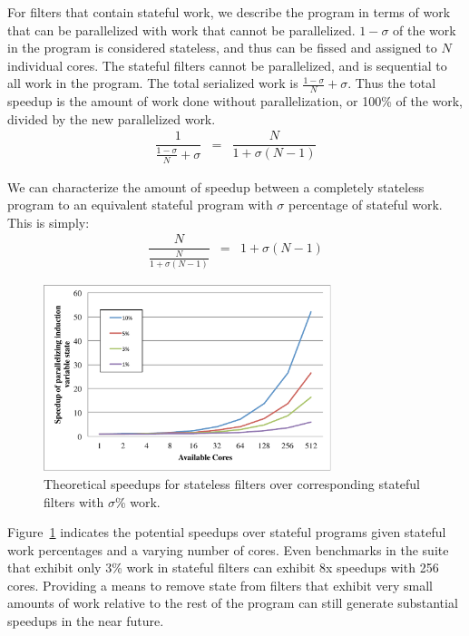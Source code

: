 For filters that contain stateful work, we describe the program in terms of work that can be parallelized with work that cannot be parallelized.  $1-\sigma$ of the work in the program is considered stateless, and thus can be fissed and assigned to $N$ individual cores.  The stateful filters cannot be parallelized, and is sequential to all work in the program.  The total serialized work is $\frac{1-\sigma}{N} + \sigma$.  Thus the total speedup is the amount of work done without parallelization, or 100\% of the work, divided by the new parallelized work.  
\begin{eqnarray*}
\dfrac{1}{\frac{1-\sigma}{N} + \sigma} &=& \dfrac{N}{1 + \sigma(N-1)}
\end{eqnarray*}

We can characterize the amount of speedup between a completely stateless program to an equivalent stateful program with $\sigma$ percentage of stateful work.  This is simply:
\begin{eqnarray*}
\dfrac{N}{\frac{N}{1 + \sigma(N-1)}} &=& 1 + \sigma(N-1)
\end{eqnarray*}



\begin{figure}[t!]
\includegraphics[width=3.3in]{figures/theoretic-speedup.pdf}
\caption{Theoretical speedups for stateless filters over corresponding stateful filters with $\sigma$\% work.  \protect\label{fig:theo-speedups}}
\end{figure}

Figure~\ref{fig:theo-speedups} indicates the potential speedups over stateful programs given stateful work percentages and a varying number of cores.  Even benchmarks in the suite that exhibit only 3\% work in stateful filters can exhibit 8x speedups with 256 cores.  Providing a means to remove state from filters that exhibit very small amounts of work relative to the rest of the program can still generate substantial speedups in the near future.



